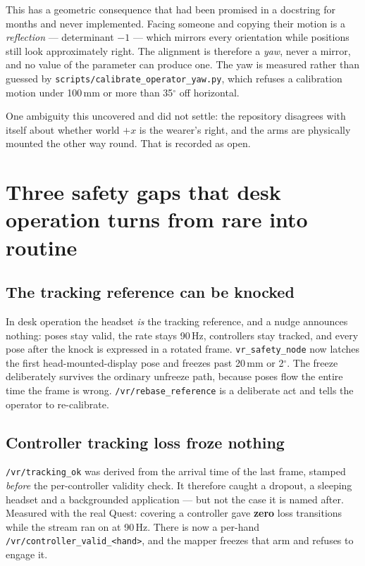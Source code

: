 \documentclass[11pt,a4paper,oneside]{report}
\newcommand{\code}[1]{\texttt{\small #1}}
\newcommand{\file}[1]{\texttt{\small #1}}
\newcommand{\dg}{$^{\circ}$}
\begin{document}
This has a geometric consequence that had been promised in a docstring for
months and never implemented. Facing someone and copying their motion is a
\emph{reflection} --- determinant $-1$ --- which mirrors every orientation while
positions still look approximately right. The alignment is therefore a
\emph{yaw}, never a mirror, and no value of the parameter can produce one. The
yaw is measured rather than guessed by
\file{scripts/calibrate\_operator\_yaw.py}, which refuses a calibration motion
under 100\,mm or more than 35\dg{} off horizontal.

One ambiguity this uncovered and did not settle: the repository disagrees with
itself about whether world $+x$ is the wearer's right, and the arms are
physically mounted the other way round. That is recorded as open.

\section{Three safety gaps that desk operation turns from rare into routine}

\subsection{The tracking reference can be knocked}

In desk operation the headset \emph{is} the tracking reference, and a nudge
announces nothing: poses stay valid, the rate stays 90\,Hz, controllers stay
tracked, and every pose after the knock is expressed in a rotated frame.
\code{vr\_safety\_node} now latches the first head-mounted-display pose and
freezes past 20\,mm or 2\dg. The freeze deliberately survives the ordinary
unfreeze path, because poses flow the entire time the frame is wrong.
\code{/vr/rebase\_reference} is a deliberate act and tells the operator to
re-calibrate.

\subsection{Controller tracking loss froze nothing}

\code{/vr/tracking\_ok} was derived from the arrival time of the last frame,
stamped \emph{before} the per-controller validity check. It therefore caught a
dropout, a sleeping headset and a backgrounded application --- but not the case
it is named after. Measured with the real Quest: covering a controller gave
\textbf{zero} loss transitions while the stream ran on at 90\,Hz. There is now
a per-hand \code{/vr/controller\_valid\_<hand>}, and the mapper freezes that arm
and refuses to engage it.
\end{document}
